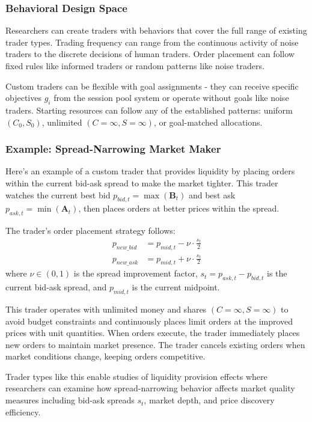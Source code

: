 \subsubsection{Behavioral Design Space}

Researchers can create traders with behaviors that cover the full range of existing trader types. Trading frequency can range from the continuous activity of noise traders to the discrete decisions of human traders. Order placement can follow fixed rules like informed traders or random patterns like noise traders.

Custom traders can be flexible with goal assignments - they can receive specific objectives $g_i$ from the session pool system or operate without goals like noise traders. Starting resources can follow any of the established patterns: uniform $(C_0, S_0)$, unlimited $(C = \infty, S = \infty)$, or goal-matched allocations.

\subsubsection{Example: Spread-Narrowing Market Maker}

Here's an example of a custom trader that provides liquidity by placing orders within the current bid-ask spread to make the market tighter. This trader watches the current best bid $p_{bid,t} = \max(\mathbf{B}_t)$ and best ask $p_{ask,t} = \min(\mathbf{A}_t)$, then places orders at better prices within the spread.

The trader's order placement strategy follows:
\begin{align}
p_{new\_bid} &= p_{mid,t} - \nu \cdot \frac{s_t}{2} \\
p_{new\_ask} &= p_{mid,t} + \nu \cdot \frac{s_t}{2}
\end{align}
where $\nu \in (0,1)$ is the spread improvement factor, $s_t = p_{ask,t} - p_{bid,t}$ is the current bid-ask spread, and $p_{mid,t}$ is the current midpoint.

This trader operates with unlimited money and shares $(C = \infty, S = \infty)$ to avoid budget constraints and continuously places limit orders at the improved prices with unit quantities. When orders execute, the trader immediately places new orders to maintain market presence. The trader cancels existing orders when market conditions change, keeping orders competitive.

Trader types like this enable studies of liquidity provision effects where researchers can examine how spread-narrowing behavior affects market quality measures including bid-ask spreads $s_t$, market depth, and price discovery efficiency.